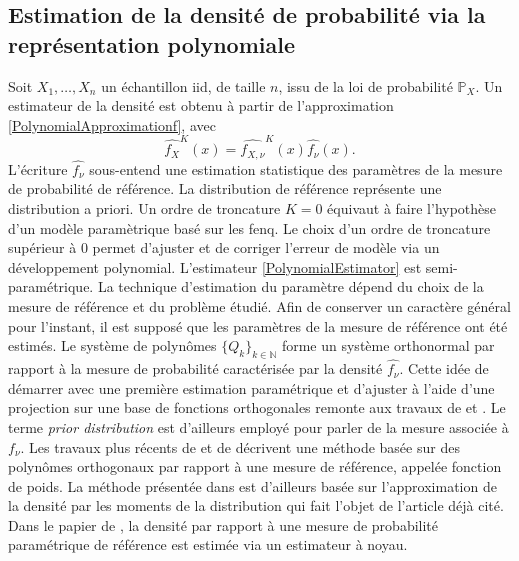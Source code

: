 \subsection{Estimation de la densité de probabilité via la représentation polynomiale}\label{Chapter2Section3}
Soit $X_{1},\ldots,X_{n}$ un échantillon \gls{iid}, de taille $n$, issu de la loi de probabilité $\mathbb{P}_{X}$. Un estimateur de la densité est obtenu à partir de l'approximation \eqref{PolynomialApproximationf}, avec 
\begin{equation}\label{PolynomialEstimator}
\widehat{f_{X}}^{K}(x)=\widehat{f_{X,\nu}}^{K}(x)\widehat{f_{\nu}}(x).
\end{equation}
L'écriture $\widehat{f_{\nu}}$ sous-entend une estimation statistique des paramètres de la mesure de probabilité de référence. La distribution de référence représente une distribution a priori. Un ordre de troncature $K=0$ équivaut à faire l'hypothèse d'un modèle paramètrique basé sur les \gls{fenq}. Le choix d'un ordre de troncature supérieur à $0$ permet d'ajuster et de corriger l'erreur de modèle via un développement polynomial. L'estimateur \eqref{PolynomialEstimator} est semi-paramétrique. La technique d'estimation du paramètre dépend du choix de la mesure de référence et du problème étudié. Afin de conserver un caractère général pour l'instant, il est supposé que les paramètres de la mesure de référence ont été estimés. Le système de polynômes $\{Q_{k}\}_{k\in\mathbb{N}}$ forme un système orthonormal par rapport à la mesure de probabilité caractérisée par la densité $\widehat{f_{\nu}}$. Cette idée de démarrer avec une première estimation paramétrique et d\rq{}ajuster à l\rq{}aide d'une projection sur une base de fonctions orthogonales remonte aux travaux de \citet{Wh58} et \citet{Br78}. Le terme \textit{prior distribution} est d\rq{}ailleurs employé pour parler de la mesure associée à $f_{\nu}$. Les travaux plus récents de \citet{Bu92} et de \citet{PrJi12} décrivent une méthode basée sur des polynômes orthogonaux par rapport à une mesure de référence, appelée fonction de poids. La méthode présentée dans \citet{PrJi12} est d'ailleurs basée sur l'approximation de la densité par les moments de la distribution qui fait l'objet de l'article \citet{Pr05} déjà cité. Dans le papier de \citet{HjGl95}, la densité par rapport à une mesure de probabilité paramétrique de référence est estimée via un estimateur à noyau.\\

